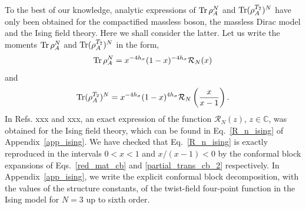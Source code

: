 \documentclass[a4paper,11pt]{article}
\def\Tr{\mathop{\mbox{\normalfont Tr}}\nolimits}
\begin{document}
To the best of our knowledge, analytic expressions of $\Tr\rho_A^N$ and $\Tr(\rho_A^{T_2})^N$ have  
only been obtained for the compactified massless boson, the massless Dirac 
model and the Ising field theory. Here we shall consider the latter. Let 
us write the moments $\Tr\rho_A^N$ and $\Tr(\rho_A^{T_2})^N$ in the form,
\begin{equation}\label{F_n_cc}
\Tr\rho_A^N=x^{-4h_\sigma}(1-x)^{-4h_\sigma}\mathcal{R}_N(x)
\end{equation}
and 
\begin{equation}\label{G_n_cc}
 \Tr(\rho_A^{T_2})^N=x^{-4h_\sigma}(1-x)^{4h_\sigma}\mathcal{R}_N\left(\frac{x}{x-1}\right).
\end{equation}
In Refs. xxx and xxx, an exact expression of the function
$\mathcal{R}_N(z)$, $z\in\mathbb{C}$, was obtained for the Ising field theory, 
which can be found in Eq.~\eqref{R_n_ising} of Appendix~\ref{app_ising}. 
We have checked that Eq.~\eqref{R_n_ising} is exactly reproduced in the intervals $0<x<1$ and $x/(x-1)<0$ by the 
conformal block expansions of Eqs.~\eqref{red_mat_cb} and \eqref{partial_trans_cb_2} 
respectively. In Appendix~\ref{app_ising}, we write the explicit 
conformal block decomposition, with the values of the structure constants, 
of the twist-field four-point function in the Ising model for $N=3$ up to sixth order. 
\end{document}
